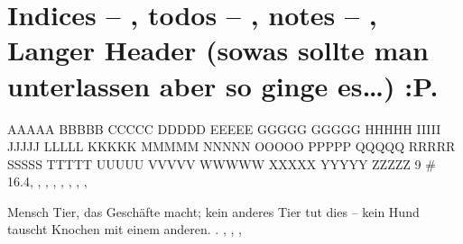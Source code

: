 \newpage%
\AfterCalculatingTypearea{%
	\TUMAfterCalculatingTypearea%
}\recalctypearea%
\chapter{Indices -- \texorpdfstring{}{imakeidx}, todos -- \texorpdfstring{}{todonotes}, notes -- \texorpdfstring{}{scrlayer-notecolumn}, Langer Header (sowas sollte man unterlassen aber so ginge es\ldots{}) :P.}%
\label{chap:IndicesTodosNotes}%
AAAAA
BBBBB
CCCCC
DDDDD
EEEEE
GGGGG
GGGGG
HHHHH
IIIII
JJJJJ
LLLLL
KKKKK
MMMMM
NNNNN
OOOOO
PPPPP
QQQQQ
RRRRR
SSSSS
TTTTT
UUUUU
VVVVV
WWWWW
XXXXX
YYYYY
ZZZZZ
9
\#\index{\#} \num{16.4}, , , 
\index{\LaTeX}, %
, %
, ,  
, \index{+!}%

 Mensch   Tier, das Geschäfte macht; kein anderes Tier tut dies -- kein Hund tauscht Knochen mit einem anderen. \cite{LabenbacherTeX}. , , , %

